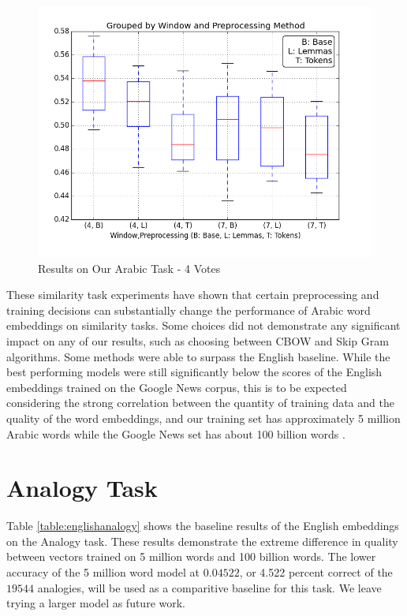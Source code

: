 \begin{figure}
  \includegraphics[width=\linewidth]{results_spearman/ar_similiarity_task_4_votes_results_spearplot.png}
  \caption{Results on Our Arabic Task - 4 Votes}
  \label{fig:spearplot4}
\end{figure}



These similarity task experiments have shown that certain preprocessing and training decisions can substantially change the performance of Arabic word embeddings on similarity tasks. Some choices did not demonstrate any significant impact on any of our results, such as choosing between CBOW and Skip Gram algorithms. Some methods were able to surpass the English baseline. While the best performing models were still significantly below the scores of the English embeddings trained on the Google News corpus, this is to be expected considering the strong correlation between the quantity of training data and the quality of the word embeddings, and our training set has approximately 5 million Arabic words while the Google News set has about 100 billion words \cite{mikolovdist:2013}.

\section{Analogy Task}

Table \ref{table:englishanalogy} shows the baseline results of the English embeddings on the Analogy task. These results demonstrate the extreme difference in quality between vectors trained on 5 million words and 100 billion words. The lower accuracy of the 5 million word model at $0.04522$, or 4.522 percent correct of the $19544$ analogies, will be used as a comparitive baseline for this task. We leave trying a larger model as future work.


